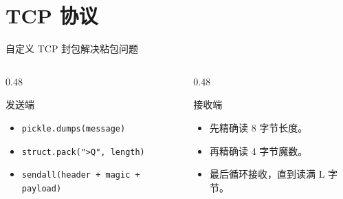 \documentclass[aspectratio=169,UTF8,fontset=fandol]{ctexbeamer}
\begin{document}
\section{TCP 协议}

\begin{frame}{自定义 TCP 封包解决粘包问题}
  \centering

  \vspace{0.5cm}
  \begin{columns}[T,onlytextwidth]
    \begin{column}{0.48\linewidth}
      \begin{block}{发送端}
        \small
        \begin{itemize}
          \item \texttt{pickle.dumps(message)}
          \item \texttt{struct.pack(">Q", length)}
          \item \texttt{sendall(header + magic + payload)}
        \end{itemize}
      \end{block}
    \end{column}
    \begin{column}{0.48\linewidth}
      \begin{block}{接收端}
        \small
        \begin{itemize}
          \item 先精确读 8 字节长度。
          \item 再精确读 4 字节魔数。
          \item 最后循环接收，直到读满 L 字节。
        \end{itemize}
      \end{block}
    \end{column}
  \end{columns}
\end{frame}
\end{document}
